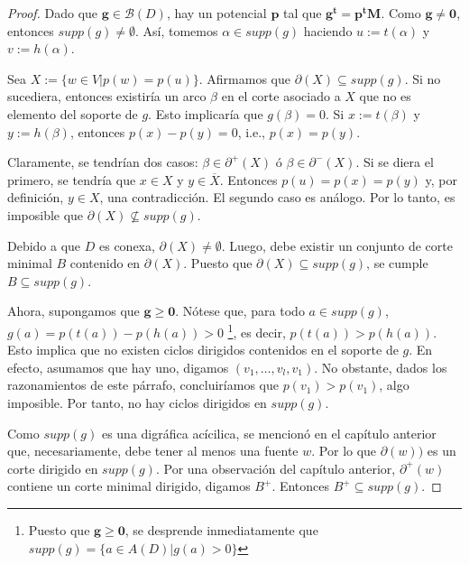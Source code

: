 \begin{proof}
Dado que $\mathbf{g} \in \mathcal{B}(D)$, hay un potencial $\mathbf{p}$ tal que $\mathbf{g^{t}} = \mathbf{p^{t}M}$. Como $\mathbf{g} \neq \mathbf{0}$, entonces $supp(g) \neq \emptyset$. Así, tomemos $\alpha \in supp(g)$ haciendo $u:=t(\alpha)$ y $v:=h(\alpha)$.

Sea $X:=\{w \in V | p(w) = p(u)\}$. Afirmamos que $\partial(X) \subseteq supp(g)$. Si no sucediera, entonces existiría un arco $\beta$ en el corte asociado a $X$ que no es elemento del soporte de $g$. Esto implicaría que $g(\beta) = 0$. Si $x:=t(\beta)$ y $y:=h(\beta)$, entonces $p(x) - p(y) = 0$, i.e., $p(x) = p(y)$.

Claramente, se tendrían dos casos: $\beta \in \partial^{+}(X)$ ó $\beta \in \partial^{-}(X)$. Si se diera el primero, se tendría que $x \in X$ y $y \in \overline{X}$. Entonces $p(u) = p(x) = p(y)$ y, por definición, $ y \in X$, una contradicción. El segundo caso es análogo. Por lo tanto, es imposible que $\partial(X)\nsubseteq supp(g)$.

Debido a que $D$ es conexa, $\partial(X) \neq \emptyset$. Luego, debe existir un conjunto de corte minimal $B$ contenido en $\partial(X)$. Puesto que $\partial(X) \subseteq supp(g)$, se cumple $B \subseteq supp(g)$.

Ahora, supongamos que $\mathbf{g} \geq \mathbf{0}$. Nótese que, para todo $a\in supp(g)$, $g(a) = p(t(a)) - p(h(a)) > 0$ \footnote{Puesto que $\mathbf{g} \geq \mathbf{0}$, se desprende inmediatamente que $supp(g) = \{a \in A(D) | g(a)>0 \}$}, es decir, $p(t(a))>p(h(a))$. Esto implica que no existen ciclos dirigidos contenidos en el soporte de $g$. En efecto, asumamos que hay uno, digamos $(v_{1},\ldots,v_{l},v_{1})$. No obstante, dados los razonamientos de este párrafo, concluiríamos que $p(v_{1}) > p(v_{1})$, algo imposible. Por tanto, no hay ciclos dirigidos en $supp(g)$.

Como $supp(g)$ es una digráfica acícilica, se mencionó en el capítulo anterior que, necesariamente, debe tener al menos una fuente $w$. Por lo que $\partial(w))$ es un corte dirigido en $supp(g)$. Por una observación del capítulo anterior, $\partial^{+}(w)$ contiene un corte minimal dirigido, digamos $B^{+}$. Entonces $B^{+} \subseteq supp(g)$. 

\end{proof}

